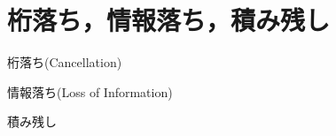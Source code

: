 \documentclass{article}
\begin{document}
\section{\textbf{桁落ち，情報落ち，積み残し}}
\begin{maplegroup}
\begin{Maple Normal}{
桁落ち(Cancellation)}\end{Maple Normal}

\end{maplegroup}
\begin{maplegroup}
\begin{Maple Normal}{
情報落ち(Loss of Information)}\end{Maple Normal}

\end{maplegroup}
\begin{maplegroup}
\begin{Maple Normal}{
積み残し}\end{Maple Normal}

\end{maplegroup}
\end{document}
